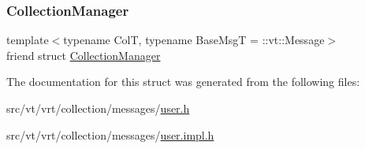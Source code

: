 \subsubsection{\texorpdfstring{Collection\+Manager}{CollectionManager}}
{\footnotesize\ttfamily template$<$typename ColT, typename Base\+MsgT = \+::vt\+::\+Message$>$ \\
friend struct \hyperlink{structvt_1_1vrt_1_1collection_1_1_collection_manager}{Collection\+Manager}\hspace{0.3cm}{\ttfamily [friend]}}



The documentation for this struct was generated from the following files\+:\begin{DoxyCompactItemize}
\item 
src/vt/vrt/collection/messages/\hyperlink{user_8h}{user.\+h}\item 
src/vt/vrt/collection/messages/\hyperlink{user_8impl_8h}{user.\+impl.\+h}\end{DoxyCompactItemize}
